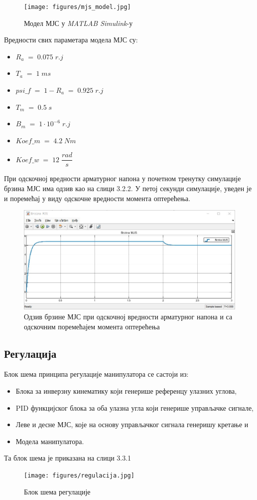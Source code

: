 \documentclass[12pt]{article}
\begin{document}
\begin{figure}[H]
    \centering
    \texttt{[image: figures/mjs\_model.jpg]}
    \caption{Модел МЈС у \textit{MATLAB Simulink}-у}
    \label{fig:мјс_simulink}
\end{figure}
Вредности свих параметара модела МЈС су:
\begin{itemize}
    \item $R_a\;=\;0.075\;r.j$
    \item $T_a\;=\;1\;ms$
    \item $psi\_f\;=\;1-R_a\;=\;0.925\;r.j$
    \item $T_m\;=\;0.5\;s$
    \item $B_m\;=\;1\cdot10^{-6}\;r.j$
    \item $Koef\_m\;=\;4.2\;Nm$
    \item $Koef\_w\;=\;12\;\dfrac{rad}{s}$
\end{itemize}
При одскочној вредности арматурног напона у почетном тренутку симулације брзина МЈС има одзив као на слици 3.2.2. У петој секунди симулације, уведен је и поремећај у виду одскочне вредности момента оптерећења.
\begin{figure}[H]
    \centering
    \includegraphics[width=15cm]{figures/brzina_mjs.jpg}
    \caption{Одзив брзине МЈС при одскочној вредности арматурног напона и са одскочним поремећајем момента оптерећења}
    \label{fig:брзина_мјс}
\end{figure}

\subsection{Регулација}
Блок шема принципа регулације манипулатора се састоји из:
\begin{itemize}
    \item Блока за инверзну кинематику који генерише референцу улазних углова,
    \item PID функцијског блока за оба улазна угла који генерише управљачке сигнале,
    \item Леве и десне МЈС, које на основу управљачког сигнала генеришу кретање и
    \item Модела манипулатора.
\end{itemize}
Та блок шема је приказана на слици 3.3.1
\begin{figure}[H]
    \centering
    \texttt{[image: figures/regulacija.jpg]}
    \caption{Блок шема регулације}
    \label{fig:регулација}
\end{figure}
\end{document}
